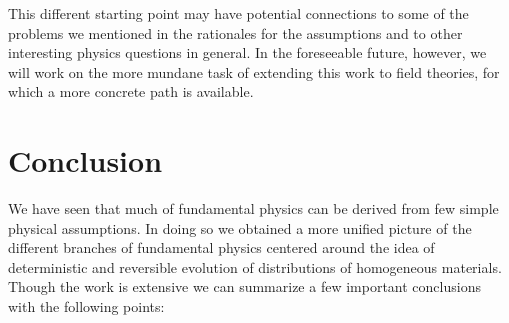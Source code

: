 \documentclass[smallextended]{svjour3}
\numberwithin{equation}{section}
\begin{document}
This different starting point may have potential connections to some of the problems we mentioned in the rationales for the assumptions and to other interesting physics questions in general. In the foreseeable future, however, we will work on the more mundane task of extending this work to field theories, for which a more concrete path is available.

\section{Conclusion}

We have seen that much of fundamental physics can be derived from few simple physical assumptions. In doing so we obtained a more unified picture of the different branches of fundamental physics centered around the idea of deterministic and reversible evolution of distributions of homogeneous materials. Though the work is extensive we can summarize a few important conclusions with the following points:
\end{document}
